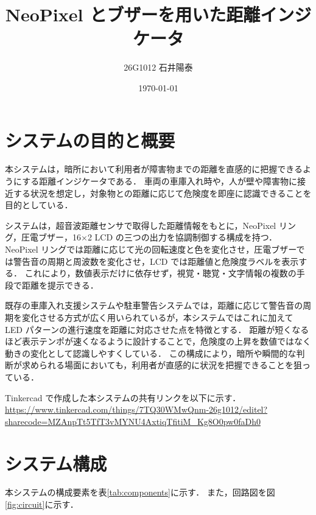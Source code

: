 \documentclass[a4paper,fontsize=11pt,line_length=40zw,number_of_lines=35,baselineskip=1.7zw]{jlreq}
\begin{document}
\title{NeoPixel とブザーを用いた距離インジケータ}
\author{26G1012 石井陽泰}
\date{\today}
\maketitle

\section{システムの目的と概要}

本システムは，暗所において利用者が障害物までの距離を直感的に把握できるようにする距離インジケータである．
車両の車庫入れ時や，人が壁や障害物に接近する状況を想定し，対象物との距離に応じて危険度を即座に認識できることを目的としている．

システムは，超音波距離センサで取得した距離情報をもとに，NeoPixel リング，圧電ブザー，16×2 LCD の三つの出力を協調制御する構成を持つ．
NeoPixel リングでは距離に応じて光の回転速度と色を変化させ，圧電ブザーでは警告音の周期と周波数を変化させ，LCD では距離値と危険度ラベルを表示する．
これにより，数値表示だけに依存せず，視覚・聴覚・文字情報の複数の手段で距離を提示できる．

既存の車庫入れ支援システムや駐車警告システムでは，距離に応じて警告音の周期を変化させる方式が広く用いられているが，本システムではこれに加えて LED パターンの進行速度を距離に対応させた点を特徴とする\cite{gripon2026MicrocontrollerBasedCarParking}．
距離が短くなるほど表示テンポが速くなるように設計することで，危険度の上昇を数値ではなく動きの変化として認識しやすくしている．
この構成により，暗所や瞬間的な判断が求められる場面においても，利用者が直感的に状況を把握できることを狙っている\cite{arduinodocumentationteam2025Tone,arduinodocumentationteam2025PulseIn,iteadstudio2010UltrasonicRangingModule}．

Tinkercad で作成した本システムの共有リンクを以下に示す．\\
\url{https://www.tinkercad.com/things/7TQ30WMwQnm-26g1012/editel?sharecode=MZAnpTt5TfT3vMYNU4AxtiqTfitiM_Kg8O0pw0faDh0}

\section{システム構成}

本システムの構成要素を表\ref{tab:components}に示す．
また，回路図を図\ref{fig:circuit}に示す．
\end{document}
